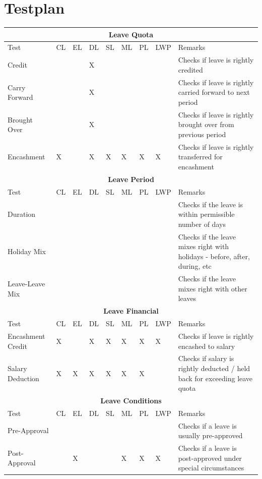 \documentclass{article}
\begin{document}
\section*{Testplan}
\begin{footnotesize}
\begin{center}
\begin{tabular}{|l||l|l|l|l|l|l|l|p{6cm}|} \hline
\multicolumn{9}{|c|}{\bf Leave Quota} \\ \hline
Test & CL & EL & DL & SL & ML & PL & LWP & Remarks \\ \hline \hline
Credit 				&&&X&&&&& Checks if leave is rightly credited \\ \hline
Carry Forward 		&&&X&&&&& Checks if leave is rightly carried forward to next period \\ \hline
Brought Over		&&&X&&&&& Checks if leave is rightly brought over from previous period \\ \hline
Encashment			&X&&X&X&X&X&X& Checks if leave is rightly transferred for encashment \\ \hline
\multicolumn{9}{|c|}{\bf Leave Period} \\ \hline
Test & CL & EL & DL & SL & ML & PL & LWP & Remarks \\ \hline \hline
Duration			&&&&&&&& Checks if the leave is within permissible number of days\\ \hline
Holiday Mix			&&&&&&&& Checks if the leave mixes right with holidays - before, after, during, etc\\ \hline
Leave-Leave Mix		&&&&&&&& Checks if the leave mixes right with other leaves \\ \hline
\multicolumn{9}{|c|}{\bf Leave Financial} \\ \hline
Test & CL & EL & DL & SL & ML & PL & LWP & Remarks \\ \hline \hline
Encashment Credit	&X&&X&X&X&X&X& Checks if leave is rightly encashed to salary \\ \hline
Salary Deduction	&X&X&X&X&X&X&& Checks if salary is rightly deducted / held back for exceeding leave quota \\ \hline
\multicolumn{9}{|c|}{\bf Leave Conditions} \\ \hline
Test & CL & EL & DL & SL & ML & PL & LWP & Remarks \\ \hline \hline
Pre-Approval		&&&&&&&& Checks if a leave is usually pre-approved\\ \hline
Post-Approval		&&X&&&X&X&X& Checks if a leave is post-approved under special circumstances\\ \hline

\end{tabular}
\end{center}
\end{footnotesize}
\end{document}
